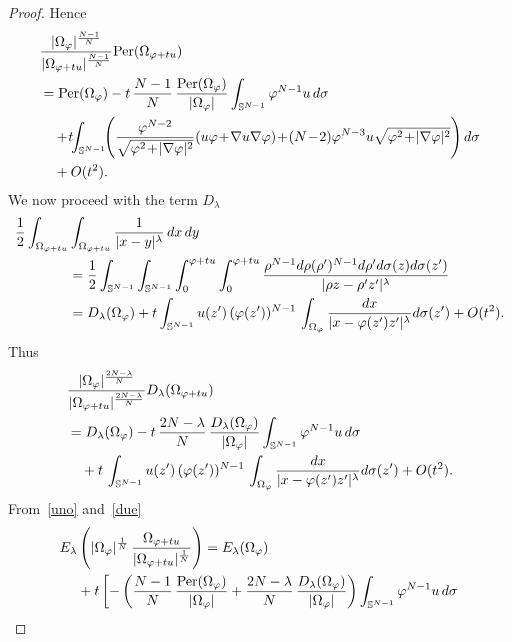 \documentclass[10pt,reqno,english]{amsart}
\newcommand{\be}{\begin{equation}}
\newcommand{\ee}{\end{equation}}
\theoremstyle{definition}
\numberwithin{equation}{section}
\begin{document}
\begin{proof}
Hence
\be\label{uno}
\begin{aligned}
     &{ |\Omega_\varphi |^{N-1 \over N} \over |\Omega_{\varphi+tu}|^{N-1\over N}}  {\mbox {Per}} (\Omega_{\varphi + t u}) \\
     &={\mbox {Per}} (\Omega_{\varphi })- t \,  {N-1 \over N} \, {{\mbox {Per}} (\Omega_{\varphi }) \over  |\Omega_\varphi |} \int_{\mathbb S^{N-1}} \varphi^{N-1} u \,d\sigma  \\
     &\quad+\!t\!\! \int_{\mathbb S^{N-1}} \!\! \left( {\varphi^{N-2} \over  \sqrt{ \varphi^2\! +\! |\nabla \varphi|^2}} (u \varphi\! +\! \nabla u \nabla \varphi)\! +\! (N\!-\!2) \varphi^{N-3} u  \sqrt{ \varphi^2 \!+\! |\nabla \varphi|^2}\right) d \sigma \\
    &\quad+ O(t^2) .
\end{aligned}
\ee
We now proceed with the term $D_\lambda$
\begin{align*}
   {1\over 2} \int_{\Omega_{\varphi +tu}}& \int_{\Omega_{\varphi +t u}} {1\over |x-y|^\lambda } \, dx \, dy\\
        &= {1\over 2}\int_{\mathbb S^{N-1}} \int_{\mathbb S^{N-1}} \int_0^{\varphi + t u}   \int_0^{\varphi + t u} {\rho^{N-1}  d \rho (\rho')^{N-1} d \rho' d \sigma(z) d \sigma(z')\over |\rho z - \rho' z'|^\lambda}\\
     &=D_\lambda(\Omega_\varphi)+ t \int_{\mathbb S^{N-1}}  u(z') \, (\varphi (z'))^{N-1} \,  \int_{\Omega_\varphi}    {  d x\over |x - \varphi (z')   z'|^\lambda} d \sigma (z') + O(t^2).
\end{align*}
Thus
\be\label{due}
\begin{aligned}
 &{ |\Omega_\varphi |^{2N-\lambda \over N} \over |\Omega_{\varphi+tu}|^{2N-\lambda\over N}}   D_\lambda(\Omega_{\varphi +tu}) \\
 &=D_\lambda(\Omega_\varphi)- t \,  {2N-\lambda \over N} \,\frac{D_\lambda(\Omega_\varphi) }{|\Omega_\varphi |}\int_{\mathbb S^{N-1}} \varphi^{N-1} u \,d\sigma  \\
     &\quad+t \, \int_{\mathbb S^{N-1}}  u(z') \, (\varphi (z'))^{N-1} \,  \int_{\Omega_\varphi}    {  d x\over |x - \varphi (z')   z'|^\lambda} d \sigma (z')+ O(t^2) .
\end{aligned}
\ee
From~\eqref{uno} and~\eqref{due}
\[
\begin{aligned}
  E_\lambda &\left( |\Omega_\varphi |^{1\over N} \, {\Omega_{\varphi +t u} \over |\Omega_{\varphi+tu}|^{1\over N}} \right) =E_\lambda(\Omega_\varphi)\\
  &+t\left[
 -\left( {N-1 \over N} \, {{\mbox {Per}} (\Omega_{\varphi }) \over  |\Omega_\varphi |} +{2N-\lambda \over N} \,\frac{D_\lambda(\Omega_\varphi) }{|\Omega_\varphi |}\right)\int_{\mathbb S^{N-1}} \varphi^{N-1} u\,d\sigma \right.\\

\end{aligned}\]
\end{proof}
\end{document}
